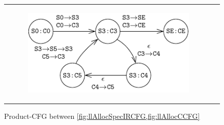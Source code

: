 \begin{figure}[H]
\begin{tabular}{cc}
\begin{subfigure}[b]{1\textwidth}
\begin{center}
{\includegraphics[scale=1.2]{chapters/figures/figMallocProductCfg.pdf}}
\end{center}
\end{subfigure}%
\end{tabular}
\caption{\label{fig:llAllocProductCFG}Product-CFG between \cref{fig:llAllocSpecIRCFG,fig:llAllocCCFG}}
\end{figure}
